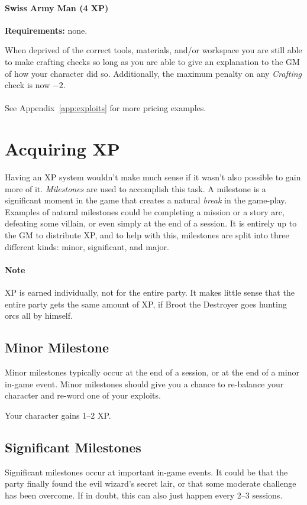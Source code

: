 \paragraph{Swiss Army Man (4 XP)}
\textbf{Requirements:} none.

When deprived of the correct tools, materials, and/or workspace you are still able to make crafting checks so long as you are able to give an explanation to the GM of how your character did so.
Additionally, the maximum penalty on any \textit{Crafting} check is now $-2$.
\\\\See Appendix~\ref{app:exploits} for more pricing examples.

\section{Acquiring XP}
Having an XP system wouldn't make much sense if it wasn't also possible to gain more of it.
\textit{Milestones} are used to accomplish this task.
A milestone is a significant moment in the game that creates a natural \textit{break} in the game-play.
Examples of natural milestones could be completing a mission or a story arc, defeating some villain, or even simply at the end of a session.
It is entirely up to the GM to distribute XP, and to help with this, milestones are split into three different kinds: minor, significant, and major.

\paragraph{Note} XP is earned individually, not for the entire party.
It makes little sense that the entire party gets the same amount of XP, if Broot the Destroyer goes hunting orcs all by himself.

\subsection{Minor Milestone}
Minor milestones typically occur at the end of a session, or at the end of a minor in-game event.
Minor milestones should give you a chance to re-balance your character and re-word one of your exploits.

Your character gains 1--2 XP.

\subsection{Significant Milestones}
Significant milestones occur at important in-game events.
It could be that the party finally found the evil wizard's secret lair, or that some moderate challenge has been overcome.
If in doubt, this can also just happen every 2--3 sessions.

